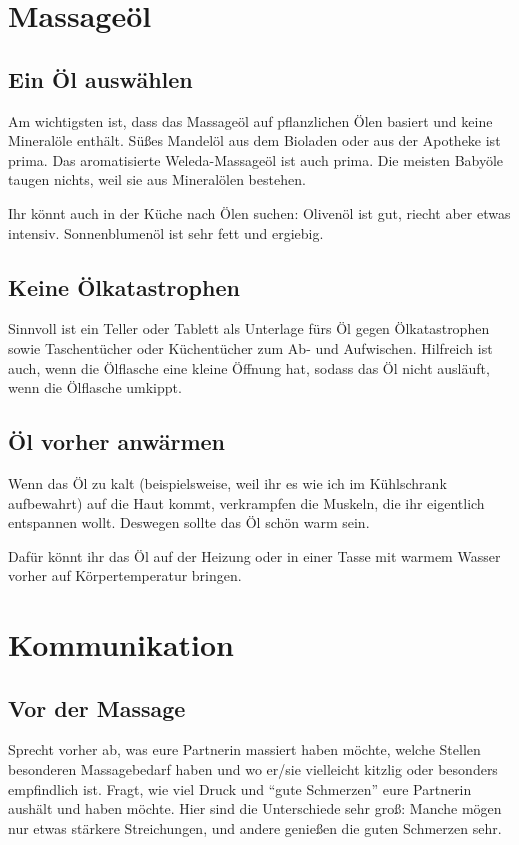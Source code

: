 \section{Massageöl}

\subsection{Ein Öl auswählen}

Am wichtigsten ist, dass das Massageöl auf pflanzlichen Ölen basiert und keine Mineralöle enthält. Süßes Mandelöl aus dem Bioladen oder aus der Apotheke ist prima. Das aromatisierte Weleda-Massageöl ist auch prima. Die meisten Babyöle taugen nichts, weil sie aus Mineralölen bestehen.

Ihr könnt auch in der Küche nach Ölen suchen: Olivenöl ist gut, riecht aber etwas intensiv. Sonnenblumenöl ist sehr fett und ergiebig.

\subsection{Keine Ölkatastrophen}

Sinnvoll ist ein Teller oder Tablett als Unterlage fürs Öl gegen Ölkatastrophen sowie Taschentücher oder Küchentücher zum Ab- und Aufwischen. Hilfreich ist auch, wenn die Ölflasche eine kleine Öffnung hat, sodass das Öl nicht ausläuft, wenn die Ölflasche umkippt.

\subsection{Öl vorher anwärmen}

Wenn das Öl zu kalt (beispielsweise, weil ihr es wie ich im Kühlschrank aufbewahrt) auf die Haut kommt, verkrampfen die Muskeln, die ihr eigentlich entspannen wollt. Deswegen sollte das Öl schön warm sein.

Dafür könnt ihr das Öl auf der Heizung oder in einer Tasse mit warmem Wasser vorher auf Körpertemperatur bringen.


\section{Kommunikation}

\subsection{Vor der Massage}

Sprecht vorher ab, was eure Partnerin massiert haben möchte, welche Stellen besonderen Massagebedarf haben und wo er/sie vielleicht kitzlig oder besonders empfindlich ist. Fragt, wie viel Druck und ``gute Schmerzen'' eure Partnerin aushält und haben möchte. Hier sind die Unterschiede sehr groß: Manche mögen nur etwas stärkere Streichungen, und andere genießen die guten Schmerzen sehr.

